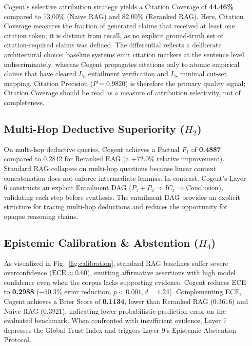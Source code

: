 \documentclass[journal,compsoc]{IEEEtran}
\begin{document}
Cogent's selective attribution strategy yields a Citation Coverage of \textbf{44.46\%} compared to 73.00\% (Naive RAG) and 82.00\% (Reranked RAG). Here, Citation Coverage measures the fraction of generated claims that received at least one citation token; it is distinct from recall, as no explicit ground-truth set of citation-required claims was defined. The differential reflects a deliberate architectural choice: baseline systems emit citation markers at the sentence level indiscriminately, whereas Cogent propagates citations only to atomic empirical claims that have cleared $L_5$ entailment verification and $L_8$ minimal cut-set mapping. Citation Precision ($P = 0.9820$) is therefore the primary quality signal; Citation Coverage should be read as a measure of attribution selectivity, not of completeness.

\subsection{Multi-Hop Deductive Superiority ($H_2$)}
On multi-hop deductive queries, Cogent achieves a Factual $F_1$ of \textbf{0.4887} compared to 0.2842 for Reranked RAG (a $+72.0\%$ relative improvement). Standard RAG collapses on multi-hop questions because linear context concatenation does not enforce intermediate lemmas. In contrast, Cogent's Layer 6 constructs an explicit Entailment DAG ($P_1 + P_2 \Rightarrow IC_1 \Rightarrow \text{Conclusion}$), validating each step before synthesis. The entailment DAG provides an explicit structure for tracing multi-hop deductions and reduces the opportunity for opaque reasoning chains.

\subsection{Epistemic Calibration \& Abstention ($H_4$)}
As visualized in Fig.~\ref{fig:calibration}, standard RAG baselines suffer severe overconfidence ($\text{ECE} \approx 0.60$), emitting affirmative assertions with high model confidence even when the corpus lacks supporting evidence. Cogent reduces ECE to \textbf{0.2988} ($-50.3\%$ error reduction, $p < 0.001, d = 1.24$). Complementing ECE, Cogent achieves a Brier Score of \textbf{0.1134}, lower than Reranked RAG ($0.3616$) and Naive RAG ($0.3921$), indicating lower probabilistic prediction error on the evaluated benchmark. When confronted with insufficient evidence, Layer 7 depresses the Global Trust Index and triggers Layer 9's Epistemic Abstention Protocol.
\end{document}
